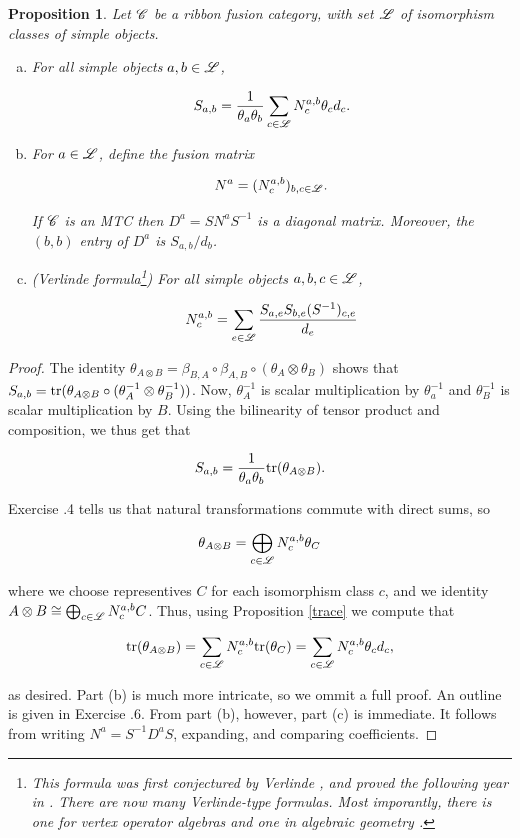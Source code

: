 \documentclass{article}
\newtheorem{proposition}{Proposition}[section]
\theoremstyle{definition}
\numberwithin{figure}{section}
\begin{document}
\begin{proposition}\label{verlinde} Let $\mathscr{C}$ be a ribbon fusion category, with set $\mathscr{L}$ of isomorphism classes of simple objects.

\begin{enumerate}[(a)]
\item For all simple objects $a,b\in \mathscr{L}$,

$$S_{a,b}=\frac{1}{\theta_a\theta_b}\sum_{c\in \mathscr{L}}N^{a,b}_{c}\theta_c d_{c}.$$

\item For $a\in \mathscr{L}$, define the fusion matrix

$$N^{a}=(N^{a,b}_{c})_{b,c\in \mathscr{L}}.$$

If $\mathscr{C}$ is an MTC then $D^a=S N^a S^{-1}$ is a diagonal matrix. Moreover, the $(b,b)$ entry of $D^a$ is $S_{a,b}/d_b$.

\item (Verlinde formula\footnote{This formula was first conjectured by Verlinde \cite{verlinde1988fusion}, and proved the following year in \cite{moore1989classical}. There are now many Verlinde-type formulas. Most imporantly, there is one for vertex operator algebras \cite{huang2008vertex} and one in algebraic geometry \cite{faltings1994proof}.}) For all simple objects $a,b,c\in\mathscr{L}$,

$$N^{a,b}_{c}=\sum_{e\in \mathscr{L}} \frac{S_{a,e} S_{b,e} (S^{-1})_{c,e}}{d_e}$$
\end{enumerate}
\end{proposition}
\begin{proof} The identity $\theta_{A\otimes B}=\beta_{B,A}\circ \beta_{A,B}\circ (\theta_A\otimes \theta_B)$ shows that $S_{a,b}=\mathrm{tr}(\theta_{A\otimes B}\circ (\theta^{-1}_A\otimes \theta^{-1}_B))$. Now, $\theta^{-1}_A$ is scalar multiplication by $\theta_a^{-1}$ and $\theta^{-1}_B$ is scalar multiplication by $B$. Using the bilinearity of tensor product and composition, we thus get that

$$S_{a,b}=\frac{1}{\theta_a\theta_b}\mathrm{tr}(\theta_{A\otimes B}).$$

Exercise \thesection.4 tells us that natural transformations commute with direct sums, so

$$\theta_{A\otimes B}=\bigoplus_{c\in \mathscr{L}}N^{a,b}_{c} \theta_C$$

where we choose representives $C$ for each isomorphism class $c$, and we identity $A\otimes B\cong \bigoplus_{c\in \mathscr{L}}N^{a,b}_c C$. Thus, using Proposition \ref{trace} we compute that

$$\mathrm{tr}(\theta_{A\otimes B})=\sum_{c\in \mathscr{L}}N^{a,b}_{c}\mathrm{tr}(\theta_C)=\sum_{c\in \mathscr{L}}N^{a,b}_c \theta_c d_c,$$

as desired. Part (b) is much more intricate, so we ommit a full proof. An outline is given in Exercise \thesection.6. From part (b), however, part (c) is immediate. It follows from writing $N^a=S^{-1}D^a S$, expanding, and comparing coefficients.
\end{proof}
\end{document}
